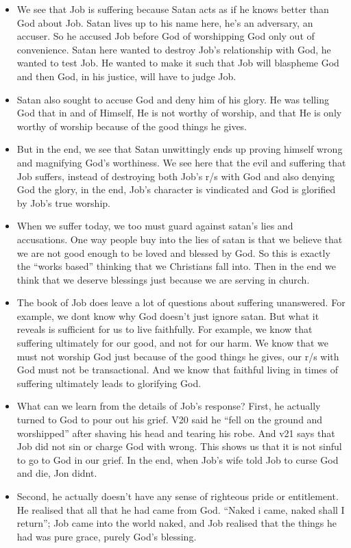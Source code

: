 \begin{itemize}
  \item{We see that Job is suffering because Satan acts as if he knows better than God about Job. Satan lives up to his name here, he’s an adversary, an accuser. So he accused Job before God of worshipping God only out of convenience. Satan here wanted to destroy Job’s relationship with God, he wanted to test Job. He wanted to make it such that Job will blaspheme God and then God, in his justice, will have to judge Job. }
  \item{Satan also sought to accuse God and deny him of his glory. He was telling God that in and of Himself, He is not worthy of worship, and that He is only worthy of worship because of the good things he gives. }
  \item{But in the end, we see that Satan unwittingly ends up proving himself wrong and magnifying God’s worthiness. We see here that the evil and suffering that Job suffers, instead of destroying both Job’s r/s with God and also denying God the glory, in the end, Job’s character is vindicated and God is glorified by Job’s true worship.}
  \item{When we suffer today, we too must guard against satan’s lies and accusations. One way people buy into the lies of satan is that we believe that we are not good enough to be loved and blessed by God. So this is exactly the “works based” thinking that we Christians fall into. Then in the end we think that we deserve blessings just because we are serving in church. }
  \item{The book of Job does leave a lot of questions about suffering unanswered. For example, we dont know why God doesn’t just ignore satan. But what it reveals is sufficient for us to live faithfully. For example, we know that suffering ultimately for our good, and not for our harm. We know that we must not worship God just because of the good things he gives, our r/s with God must not be transactional. And we know that faithful living in times of suffering ultimately leads to glorifying God. }
  \item{What can we learn from the details of Job’s response? First, he actually turned to God to pour out his grief. V20 said he “fell on the ground and worshipped” after shaving his head and tearing his robe. And v21 says that Job did not sin or charge God with wrong. This shows us that it is not sinful to go to God in our grief. In the end, when Job’s wife told Job to curse God and die, Jon didnt.}
  \item{Second, he actually doesn’t have any sense of righteous pride or entitlement. He realised that all that he had came from God. “Naked i came, naked shall I return”; Job came into the world naked, and Job realised that the things he had was pure grace, purely God’s blessing. }

\end{itemize}
